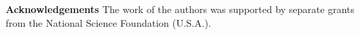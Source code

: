 {\bf Acknowledgements}  The work of the authors was supported
by separate grants from the National Science Foundation (U.S.A.).

